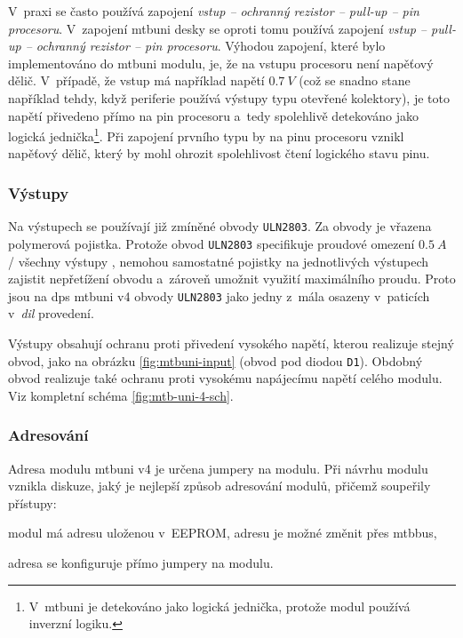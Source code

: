 V~praxi se často používá zapojení \textit{vstup – ochranný rezistor – pull-up –
pin procesoru}. V~zapojení \gls{mtbuni} desky se oproti tomu používá zapojení
\textit{vstup – pull-up – ochranný rezistor – pin procesoru}. Výhodou zapojení,
které bylo implementováno do \gls{mtbuni} modulu, je, že na vstupu procesoru
není napěťový dělič. V~případě, že vstup má například napětí $0.7~V$ (což se
snadno stane například tehdy, když periferie používá výstupy typu otevřené
kolektory), je toto napětí přivedeno přímo na pin procesoru a~tedy spolehlivě
detekováno jako logická jednička\footnote{V~\gls{mtbuni} je detekováno
jako logická jednička, protože modul používá inverzní logiku.}. Při zapojení
prvního typu by na pinu procesoru vznikl napěťový dělič, který by mohl ohrozit
spolehlivost čtení logického stavu pinu.

\subsubsection{\textbf{Výstupy}}

Na výstupech se používají již zmíněné obvody \texttt{ULN2803}. Za obvody
je vřazena polymerová pojistka. Protože obvod \texttt{ULN2803} specifikuje
proudové omezení $0.5~A$ / všechny výstupy \cite{uln2803-datasheet}, nemohou
samostatné pojistky na jednotlivých výstupech zajistit nepřetížení obvodu
a~zároveň umožnit využití maximálního proudu. Proto jsou na \gls{dps}
\gls{mtbuni} v4 obvody \texttt{ULN2803} jako jedny z~mála osazeny v~paticích
v~\textit{\gls{dil}} provedení.

Výstupy obsahují ochranu proti přivedení vysokého napětí, kterou realizuje
stejný obvod, jako na obrázku \ref{fig:mtbuni-input} (obvod pod diodou
\texttt{D1}). Obdobný obvod realizuje také ochranu proti vysokému napájecímu
napětí celého modulu. Viz kompletní schéma \ref{fig:mtb-uni-4-sch}.

\subsubsection{\textbf{Adresování}}

Adresa modulu \gls{mtbuni} v4 je určena jumpery na modulu. Při návrhu modulu
vznikla diskuze, jaký je nejlepší způsob adresování modulů, přičemž soupeřily
přístupy:

\begin{compactenum}
\item modul má adresu uloženou v~EEPROM, adresu je možné změnit přes \gls{mtbbus},
\item adresa se konfiguruje přímo jumpery na modulu.
\end{compactenum}


